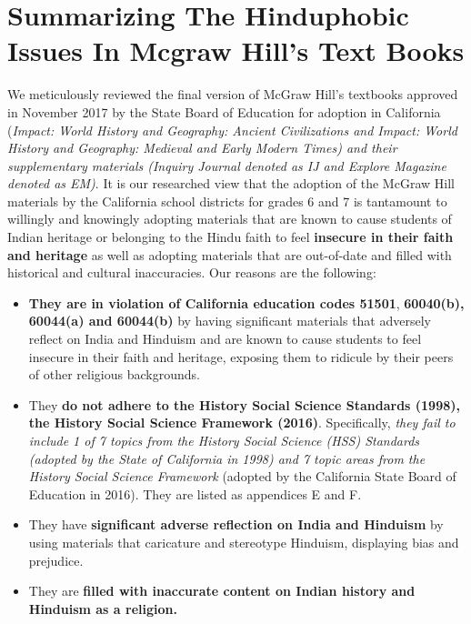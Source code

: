 \chapter{Summarizing The Hinduphobic Issues In Mcgraw Hill’s Text Books}

\rhead[]{\leftmark\quad\small\thepage}

We meticulously reviewed the final version of McGraw Hill’s textbooks approved in November 2017 by the State Board of Education for adoption in California (\textit{Impact: World History and Geography: Ancient Civilizations and Impact: World History and Geography: Medieval and Early Modern Times) and their supplementary materials (Inquiry Journal denoted as IJ and Explore Magazine denoted as EM)}. It is our researched view that the adoption of the McGraw Hill materials by the California school districts for grades 6 and 7 is tantamount to willingly and knowingly adopting materials that are known to cause students of Indian heritage or belonging to the Hindu faith to feel \textbf{insecure in their faith and heritage} as well as adopting materials that are out-of-date and filled with historical and cultural inaccuracies. Our reasons are the following:

\begin{itemize} 
\item \textbf{They are in violation of California education codes 51501}, \textbf{60040(b), 60044(a) and 60044(b)} by having significant materials that adversely reflect on India and Hinduism and are known to cause students to feel insecure in their faith and heritage, exposing them to ridicule by their peers of other religious backgrounds. 
\item They \textbf{do not adhere to the History Social Science Standards (1998), the History Social Science Framework (2016)}. Specifically, \textit{they fail to include 1 of 7 topics from the History Social Science (HSS) Standards (adopted by the State of California in 1998) and 7 topic areas from the History Social Science Framework} (adopted by the California State Board of Education in 2016). They are listed as appendices E and F. 
\item They have \textbf{significant adverse reflection on India and Hinduism} by using materials that caricature and stereotype Hinduism, displaying bias and prejudice.
\item They are \textbf{filled with inaccurate content on Indian history and Hinduism as a religion.} 
\end{itemize}

